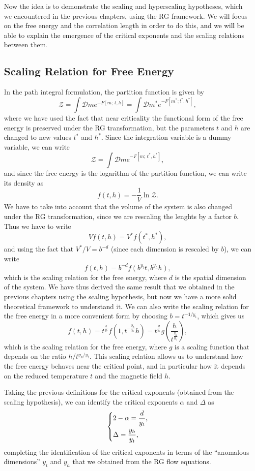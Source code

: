 Now the idea is to demonstrate the scaling and hyperscaling hypotheses, which we encountered in the previous chapters, using the RG framework. We will focus on the free energy and the correlation length in order to do this, and we will be able to explain the emergence of the critical exponents and the scaling relations between them.

\subsection{Scaling Relation for Free Energy}

In the path integral formulation, the partition function is given by
\[
    \mathcal{Z} = \int \mathcal{D} m e^{-F[m; \,t,h]} = \int \mathcal{D} m^{*} e^{-F[m^{*}; t^*, h^*]},
\]
where we have used the fact that near criticality the functional form of the free energy is preserved under the RG transformation, but the parameters \(t\) and \(h\) are changed to new values \(t^*\) and \(h^*\). Since the integration variable is a dummy variable, we can write
\[
    \mathcal{Z} = \int \mathcal{D} m e^{-F[m;\, t^*, h^*]},
\]
and since the free energy is the logarithm of the partition function, we can write its density as
\[
    f(t,h) = -\frac{1}{V} \ln \mathcal{Z}.
\]
We have to take into account that the volume of the system is also changed under the RG transformation, since we are rescaling the lenghts by a factor \(b\). Thus we have to write
\[
    V f(t,h) = V^* f (t^*, h^*),
\]
and using the fact that \(V^* / V = b^{-d}\) (since each dimension is rescaled by \(b\)), we can write
\[
    f(t,h) = b^{-d} f (b^{y_t} t, b^{y_h} h),
\]
which is the scaling relation for the free energy, where \(d\) is the spatial dimension of the system. We have thus derived the same result that we obtained in the previous chapters using the scaling hypothesis, but now we have a more solid theoretical framework to understand it. We can also write the scaling relation for the free energy in a more convenient form by choosing \(b = t^{-1/y_t}\), which gives us
\[
    f(t,h) = t^{\frac{d}{y_t}} f(1, t^{-\frac{y_h}{y_t}} h) = t^{\frac{d}{y_t}} g\left(\frac{h}{t^{\frac{y_h}{y_t}}}\right),
\]
which is the scaling relation for the free energy, where \(g\) is a scaling function that depends on the ratio \(h / t^{y_h / y_t}\). This scaling relation allows us to understand how the free energy behaves near the critical point, and in particular how it depends on the reduced temperature \(t\) and the magnetic field \(h\).

Taking the previous definitions for the critical exponents (obtained from the scaling hypothesis), we can identify the critical exponents \(\alpha\) and \(\Delta\) as
\[
    \begin{dcases}
        2-\alpha = \frac{d}{y_t}, \\
        \Delta = \frac{y_h}{y_t},
    \end{dcases}
\]
completing the identification of the critical exponents in terms of the ``anomalous dimensions'' \(y_t\) and \(y_h\) that we obtained from the RG flow equations.

